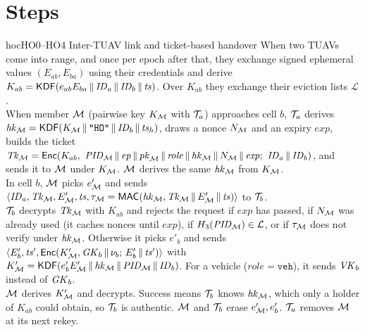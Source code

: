 \section{Steps}
\begin{stepbox}{hoc}{HO0--HO4 \;Inter-TUAV link and ticket-based handover}
 When two TUAVs come into range, and once per epoch after that, they exchange signed ephemeral values $(E_{ab},E_{ba})$ using their
credentials and derive $K_{ab}=\mathsf{KDF}(e_{ab}E_{ba}\,\|\,\mathit{ID}_a\,\|\,\mathit{ID}_b\,\|\,\mathit{ts})$. Over $K_{ab}$ they exchange their eviction lists $\mathcal{L}$.\\[2pt]
 When member $\mathcal{M}$ (pairwise key $K_{\mathcal{M}}$ with $\mathcal{T}_a$) approaches cell $b$, $\mathcal{T}_a$ derives $\mathit{hk}_{\mathcal{M}}=\mathsf{KDF}(K_{\mathcal{M}}\,\|\,\texttt{"HO"}\,\|\,\mathit{ID}_b\,\|\,\mathit{ts}_h)$,
draws a nonce $N_{\mathcal{M}}$ and an expiry $\mathit{exp}$, builds the ticket
$\Tk_\M=\Enc(K_{ab},\ \PID_\M\cat\ep\cat\pk_\M\cat\mathit{role}\cat\hk_\M\cat N_\M\cat\mathit{exp};\ \ID_a\cat\ID_b)$, and sends it to $\mathcal{M}$ under $K_{\mathcal{M}}$.
$\mathcal{M}$ derives the same $\mathit{hk}_{\mathcal{M}}$ from $K_{\mathcal{M}}$.\\[2pt]
 In cell $b$, $\mathcal{M}$ picks $e'_{\mathcal{M}}$ and sends $\langle\mathit{ID}_a,\mathit{Tk}_{\mathcal{M}},E'_{\mathcal{M}},\mathit{ts},\tau_{\mathcal{M}}=\mathsf{MAC}(\mathit{hk}_{\mathcal{M}},\mathit{Tk}_{\mathcal{M}}\,\|\, E'_{\mathcal{M}}\,\|\,\mathit{ts})\rangle$ to $\mathcal{T}_b$.\\[2pt]
 $\mathcal{T}_b$ decrypts $\mathit{Tk}_{\mathcal{M}}$ with $K_{ab}$ and rejects the request if $\mathit{exp}$ has passed, if $N_{\mathcal{M}}$ was already used (it caches nonces until
$\mathit{exp}$), if $H_3(\mathit{PID}_{\mathcal{M}})\in\mathcal{L}$, or if $\tau_{\mathcal{M}}$ does not verify under $\mathit{hk}_{\mathcal{M}}$. Otherwise it picks $e'_b$ and sends
$\langle E'_b,\mathit{ts}',\mathsf{Enc}(K'_{\mathcal{M}},\mathit{GK}_b\,\|\,\nu_b;\,E'_b\,\|\,\mathit{ts}')\rangle$ with $K'_{\mathcal{M}}=\mathsf{KDF}(e'_bE'_{\mathcal{M}}\,\|\,\mathit{hk}_{\mathcal{M}}\,\|\,\mathit{PID}_{\mathcal{M}}\,\|\,\mathit{ID}_b)$. For a vehicle
($\mathit{role}=\texttt{veh}$), it sends $\mathit{VK}_b$ instead of $\mathit{GK}_b$.\\[2pt]
 $\mathcal{M}$ derives $K'_{\mathcal{M}}$ and decrypts. Success means $\mathcal{T}_b$ knows $\mathit{hk}_{\mathcal{M}}$, which only a holder of $K_{ab}$ could obtain, so $\mathcal{T}_b$ is authentic.
$\mathcal{M}$ and $\mathcal{T}_b$ erase $e'_{\mathcal{M}},e'_b$. $\mathcal{T}_a$ removes $\mathcal{M}$ at its next rekey.
\end{stepbox}

